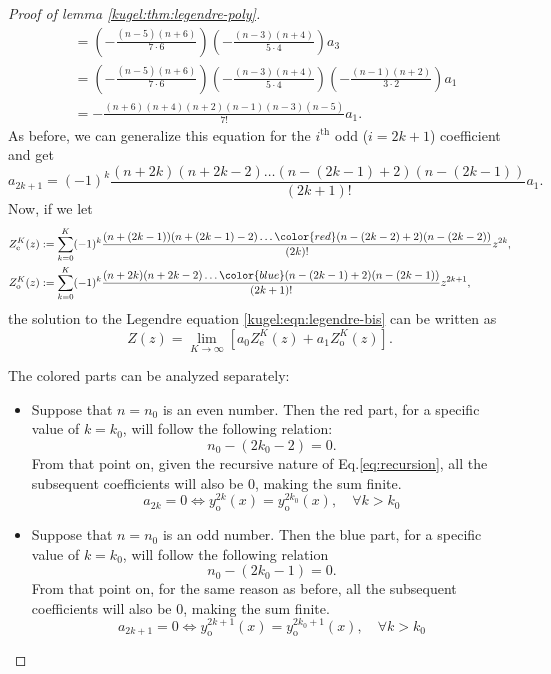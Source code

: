 \begin{proof}[Proof of lemma \ref{kugel:thm:legendre-poly}]
\begin{align*}
      &= \left( -\frac{(n-5)(n+6)}{7 \cdot 6} \right)
         \left( -\frac{(n-3)(n+4)}{5 \cdot 4} \right) a_3 \\
      &= \left( -\frac{(n-5)(n+6)}{7 \cdot 6} \right)
         \left( -\frac{(n-3)(n+4)}{5 \cdot 4} \right)
         \left( -\frac{(n-1)(n+2)}{3 \cdot 2} \right) a_1 \\
      &= -\frac{(n+6)(n+4)(n+2)(n-1)(n-3)(n-5)}{7!} a_1.
  \end{align*}
  As before, we can generalize this equation for the $i^\text{th}$ odd ($i =
  2k+1$) coefficient and get
  \begin{equation*}
    a_{2k+1} = (-1)^k \frac{(n + 2k)(n+2k-2)
      \hdots (n-(2k-1)+2)(n-(2k-1))}{(2k+1)!} a_1.
  \end{equation*}
  Now, if we let
  \begin{align*}
    Z_\text{e}^K(z) &:=
      \sum_{k=0}^K(-1)^k \frac{
        (n+(2k-1))(n+(2k-1)-2) \hdots
        \color{red}(n-(2k-2)+2)(n-(2k-2))
      }{(2k)!} z^{2k}, \\
    Z_\text{o}^K(z) &:=
      \sum_{k=0}^K(-1)^k \frac{
        (n + 2k)(n+2k-2)\hdots \color{blue} (n-(2k-1)+2)(n-(2k-1))
      }{(2k+1)!} z^{2k+1},
  \end{align*}
  the solution to the Legendre equation \eqref{kugel:eqn:legendre-bis} can be
  written as
  \begin{equation}\label{eq:solution}
    Z(z) = \lim_{K \to \infty} \left[
      a_0 Z_\text{e}^K(z) + a_1 Z_\text{o}^K(z)
    \right].
  \end{equation}

  The colored parts can be analyzed separately:
  \begin{itemize}
    \item[\textcolor{red}{\textbullet}] Suppose that $n=n_0$ is an even number. Then the red part, for a specific value of $k=k_0$, will follow the following relation:
      \begin{equation*}
        n_0-(2k_0-2)=0. 
      \end{equation*}
      From that point on, given the recursive nature of Eq.\eqref{eq:recursion}, all the subsequent coefficients will also be 0, making the sum finite.
      \begin{equation*}
        a_{2k}=0 \iff y_{\text{o}}^{2k}(x)=y_{\text{o}}^{2k_0}(x), \quad \forall k>k_0
      \end{equation*} 
    \item[\textcolor{blue}{\textbullet}] Suppose that $n=n_0$ is an odd number. Then the blue part, for a specific value of $k=k_0$, will follow the following relation 
      \begin{equation*}
        n_0-(2k_0-1)=0.  
      \end{equation*}
      From that point on, for the same reason as before, all the subsequent coefficients will also be 0, making the sum finite.
      \begin{equation*}
        a_{2k+1}=0 \iff y_{\text{o}}^{2k+1}(x)=y_{\text{o}}^{2k_0+1}(x), \quad \forall k>k_0
      \end{equation*}
  \end{itemize} 


\end{proof}
